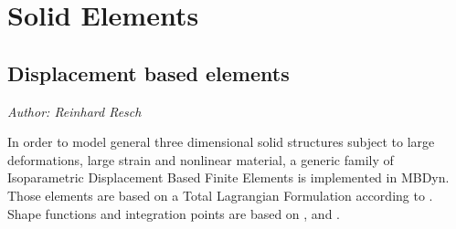 %
%
%
%
%
%
%
%

\section{Solid Elements}
\label{sec:EL:SOLID}

\subsection{Displacement based elements}
\emph{Author: Reinhard Resch}

In order to model general three dimensional solid structures subject to large deformations,
large strain and nonlinear material, a generic family of Isoparametric Displacement Based Finite Elements is implemented in MBDyn.
Those elements are based on a Total Lagrangian Formulation according to \cite{BATHE2016}. Shape functions and integration points are based on \cite{BATHE2016}, \cite{DHONDT2004} and \cite{CODEASTERR30301}.

